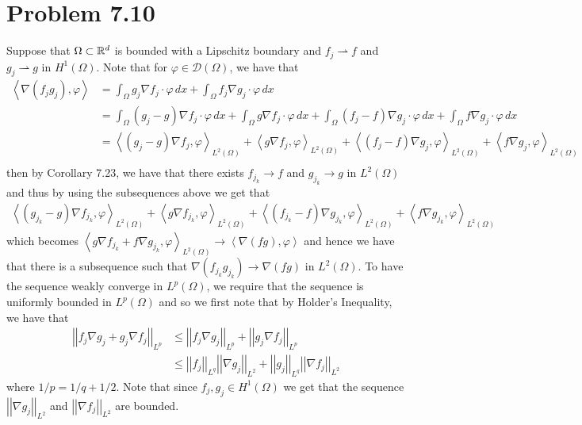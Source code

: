 \documentclass[12pt]{report}
\newcommand{\norm}[1]{\left|\left|#1\right|\right|}
\newcommand{\inner}[2]{\left\langle#1,#2\right\rangle}
\begin{document}
\section*{Problem 7.10}
Suppose that $\Omega \subset \mathbb{R}^d$ is bounded with a Lipschitz boundary and $f_j \rightharpoonup f$ and $g_j \rightharpoonup g$ in $H^1(\Omega)$. Note that for $\varphi \in \mathcal{D}(\Omega)$, we have that
\begin{align*}
  \inner{\nabla(f_jg_j)}{\varphi} &= \int_{\Omega} g_j \nabla f_j \cdot \varphi \,dx  + \int_{\Omega} f_j \nabla g_j \cdot  \varphi \, dx \\
                                  &= \int_{\Omega} (g_j - g)\nabla f_j \cdot \varphi \, dx + \int_{\Omega} g \nabla f_j \cdot \varphi \, dx + \int_{\Omega} (f_j - f)\nabla g_j \cdot \varphi \, dx + \int_{\Omega} f \nabla g_j \cdot \varphi \, dx \\ 
                                  &= \inner{(g_j - g)\nabla f_j  }{\varphi}_{L^2(\Omega)} + \inner{g\nabla f_j}{\varphi}_{L^2(\Omega)} + \inner{(f_j - f)\nabla g_j}{\varphi}_{L^2(\Omega)} + \inner{f \nabla g_j}{\varphi}_{L^2(\Omega)} \\
\end{align*}
then by Corollary 7.23, we have that there exists $f_{j_k} \to f$ and $g_{j_k} \to g$ in $L^2(\Omega)$ and thus by using the subsequences above we get that
\begin{align*}  
  \inner{(g_{j_k} - g)\nabla f_{j_k}  }{\varphi}_{L^2(\Omega)} + \inner{g\nabla f_{j_k}}{\varphi}_{L^2(\Omega)} + \inner{(f_{j_k} - f)\nabla g_{j_k}}{\varphi}_{L^2(\Omega)} + \inner{f \nabla g_{j_k}}{\varphi}_{L^2(\Omega)} 
\end{align*}
which becomes $\inner{g \nabla f_{j_k} + f \nabla g_{j_k}}{\varphi}_{L^2(\Omega)} \to \inner{\nabla(fg)}{\varphi}$ and hence we have that there is a subsequence such that $\nabla(f_{j_k}g_{j_k}) \to \nabla(fg)$ in $L^2(\Omega)$. To have the sequence weakly converge in $L^p(\Omega)$, we require that the sequence is uniformly bounded in $L^p(\Omega)$ and so we first note that by Holder's Inequality, we have that
\begin{align*}  \norm{f_j \nabla g_j + g_j \nabla f_j}_{L^p} &\leq \norm{f_j \nabla g_j}_{L^p} + \norm{g_j \nabla f_j}_{L^p} \\
  &\leq \norm{f_j}_{L^q} \norm{\nabla g_j}_{L^2} + \norm{g_j}_{L^q} \norm{\nabla f_j}_{L^2} 
\end{align*}
where $1/p = 1/q + 1/2$. Note that since $f_j,g_j \in H^1(\Omega)$ we get that the sequence $\norm{\nabla g_j}_{L^2}$ and $\norm{\nabla f_j}_{L^2}$ are bounded. 
\end{document}

